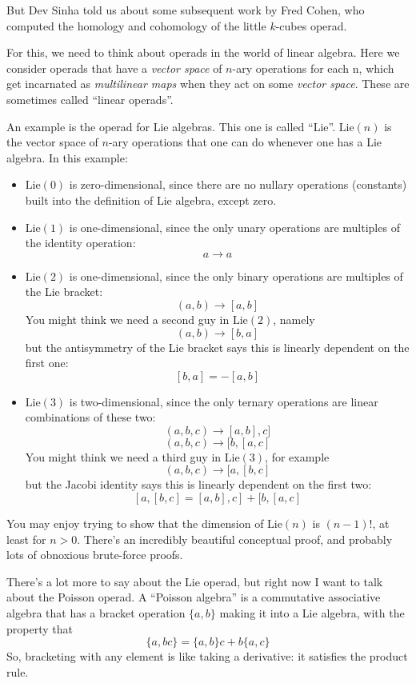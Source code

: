 \documentclass{article}
\begin{document}
But Dev Sinha told us about some subsequent work by Fred Cohen, who
computed the homology and cohomology of the little \(k\)-cubes operad.

For this, we need to think about operads in the world of linear algebra.
Here we consider operads that have a \emph{vector space} of \(n\)-ary
operations for each n, which get incarnated as \emph{multilinear maps}
when they act on some \emph{vector space}. These are sometimes called
``linear operads''.

An example is the operad for Lie algebras. This one is called ``Lie''.
\(\mathrm{Lie}(n)\) is the vector space of \(n\)-ary operations that one
can do whenever one has a Lie algebra. In this example:

\begin{itemize}
\item
  \(\mathrm{Lie}(0)\) is zero-dimensional, since there are no nullary
  operations (constants) built into the definition of Lie algebra,
  except zero.
\item
  \(\mathrm{Lie}(1)\) is one-dimensional, since the only unary
  operations are multiples of the identity operation: \[a \to a\]
\item
  \(\mathrm{Lie}(2)\) is one-dimensional, since the only binary
  operations are multiples of the Lie bracket: \[(a,b) \to [a,b]\] You
  might think we need a second guy in \(\mathrm{Lie}(2)\), namely
  \[(a,b) \to [b,a]\] but the antisymmetry of the Lie bracket says this
  is linearly dependent on the first one: \[[b,a] = -[a,b]\]
\item
  \(\mathrm{Lie}(3)\) is two-dimensional, since the only ternary
  operations are linear combinations of these two:
  \[(a,b,c) \to [a,b],c]\] \[(a,b,c) \to [b,[a,c]\] You might think we
  need a third guy in \(\mathrm{Lie}(3)\), for example
  \[(a,b,c) \to [a,[b,c]\] but the Jacobi identity says this is linearly
  dependent on the first two: \[[a,[b,c] = [a,b],c] + [b,[a,c]\]
\end{itemize}

You may enjoy trying to show that the dimension of \(\mathrm{Lie}(n)\)
is \((n-1)!\), at least for \(n > 0\). There's an incredibly beautiful
conceptual proof, and probably lots of obnoxious brute-force proofs.

There's a lot more to say about the Lie operad, but right now I want to
talk about the Poisson operad. A ``Poisson algebra'' is a commutative
associative algebra that has a bracket operation \(\{a,b\}\) making it
into a Lie algebra, with the property that
\[\{a,bc\} = \{a,b\}c + b\{a,c\}\] So, bracketing with any element is
like taking a derivative: it satisfies the product rule.
\end{document}
